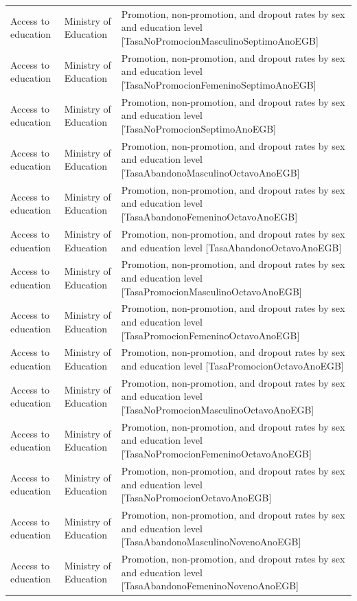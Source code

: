 \documentclass[10pt,a4paper]{article}
\begin{document}
\begin{longtable}{@{}>{\raggedright\arraybackslash}p{3.5cm}>{\raggedright\arraybackslash}p{5.6cm}>{\raggedright\arraybackslash}p{\dimexpr\textwidth-9.1cm-4\tabcolsep\relax}@{}}
Access to education & Ministry of Education & Promotion, non-promotion, and dropout rates by sex and education level [TasaNoPromocionMasculinoSeptimoAnoEGB]\\
Access to education & Ministry of Education & Promotion, non-promotion, and dropout rates by sex and education level [TasaNoPromocionFemeninoSeptimoAnoEGB]\\
Access to education & Ministry of Education & Promotion, non-promotion, and dropout rates by sex and education level [TasaNoPromocionSeptimoAnoEGB]\\
Access to education & Ministry of Education & Promotion, non-promotion, and dropout rates by sex and education level [TasaAbandonoMasculinoOctavoAnoEGB]\\
Access to education & Ministry of Education & Promotion, non-promotion, and dropout rates by sex and education level [TasaAbandonoFemeninoOctavoAnoEGB]\\
Access to education & Ministry of Education & Promotion, non-promotion, and dropout rates by sex and education level [TasaAbandonoOctavoAnoEGB]\\
Access to education & Ministry of Education & Promotion, non-promotion, and dropout rates by sex and education level [TasaPromocionMasculinoOctavoAnoEGB]\\
Access to education & Ministry of Education & Promotion, non-promotion, and dropout rates by sex and education level [TasaPromocionFemeninoOctavoAnoEGB]\\
Access to education & Ministry of Education & Promotion, non-promotion, and dropout rates by sex and education level [TasaPromocionOctavoAnoEGB]\\
Access to education & Ministry of Education & Promotion, non-promotion, and dropout rates by sex and education level [TasaNoPromocionMasculinoOctavoAnoEGB]\\
Access to education & Ministry of Education & Promotion, non-promotion, and dropout rates by sex and education level [TasaNoPromocionFemeninoOctavoAnoEGB]\\
Access to education & Ministry of Education & Promotion, non-promotion, and dropout rates by sex and education level [TasaNoPromocionOctavoAnoEGB]\\
Access to education & Ministry of Education & Promotion, non-promotion, and dropout rates by sex and education level [TasaAbandonoMasculinoNovenoAnoEGB]\\
Access to education & Ministry of Education & Promotion, non-promotion, and dropout rates by sex and education level [TasaAbandonoFemeninoNovenoAnoEGB]\\

\end{longtable}
\end{document}
